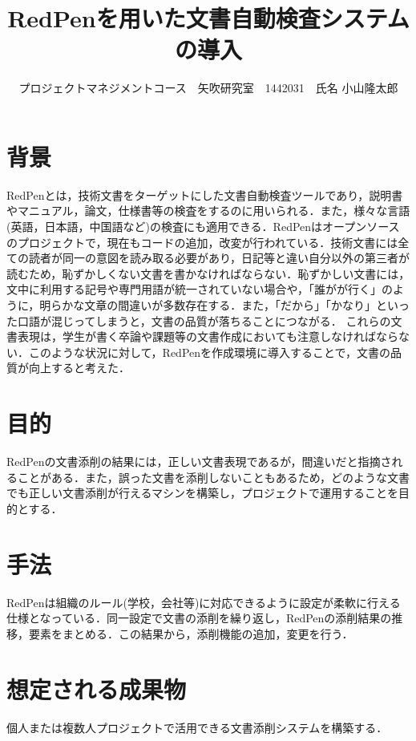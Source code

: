 \documentclass[uplatex,twocolumn,dvipdfmx]{jsarticle}
\title{\vspace{-5mm}\fontsize{14pt}{0pt}\selectfont RedPenを用いた文書自動検査システムの導入}
\author{\normalsize プロジェクトマネジメントコース　矢吹研究室　1442031　氏名 小山隆太郎}
\date{}
\begin{document}
\fontsize{10.5pt}{\baselineskip}\selectfont
\maketitle





\section{背景}
RedPen\cite{a}とは，技術文書をターゲットにした文書自動検査ツールであり，説明書やマニュアル，論文，仕様書等の検査をするのに用いられる．また，様々な言語(英語，日本語，中国語など)の検査にも適用できる．RedPenはオープンソースのプロジェクトで，現在もコードの追加，改変が行われている\cite{b}．技術文書には全ての読者が同一の意図を読み取る必要があり，日記等と違い自分以外の第三者が読むため，恥ずかしくない文書を書かなければならない．恥ずかしい文書には，文中に利用する記号や専門用語が統一されていない場合や，「誰がが行く」のように，明らかな文章の間違いが多数存在する．また，「だから」「かなり」といった口語が混じってしまうと，文書の品質が落ちることにつながる．
これらの文書表現は，学生が書く卒論や課題等の文書作成においても注意しなければならない．このような状況に対して，RedPenを作成環境に導入することで，文書の品質が向上すると考えた．

\section{目的}
RedPenの文書添削の結果には，正しい文書表現であるが，間違いだと指摘されることがある．また，誤った文書を添削しないこともあるため，どのような文書でも正しい文書添削が行えるマシンを構築し，プロジェクトで運用することを目的とする．
\section{手法}
RedPenは組織のルール(学校，会社等)に対応できるように設定が柔軟に行える仕様となっている\cite{c}．同一設定で文書の添削を繰り返し，RedPenの添削結果の推移，要素をまとめる．この結果から，添削機能の追加，変更を行う．
\section{想定される成果物}
個人または複数人プロジェクトで活用できる文書添削システムを構築する．
\end{document}
